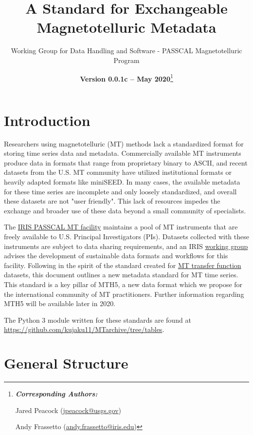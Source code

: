 \documentclass[12pt]{article}
\title{A Standard for Exchangeable Magnetotelluric Metadata}
\date{\textbf{Version 0.0.1c -- May 2020}\footnote{\noindent\textbf{\textit{Corresponding Authors:}}
		
		Jared Peacock (\url{jpeacock@usgs.gov})
		
		Andy Frassetto (\url{andy.frassetto@iris.edu})}}
\author[1]{Working Group for Data Handling and Software - PASSCAL Magnetotelluric Program}
\affil[1]{Portable Array Seismic Studies of the Continental Lithosphere, Incorporated Research Institutions for Seismology}
\begin{document}
	
\maketitle

\tableofcontents
\vspace{1cm}


\newpage

\section{Introduction}

Researchers using magnetotelluric (MT) methods lack a standardized format for storing time series data and metadata. Commercially available MT instruments produce data in formats that range from proprietary binary to ASCII, and recent datasets from the U.S. MT community have utilized institutional formats or heavily adapted formats like miniSEED. In many cases, the available metadata for these time series are incomplete and only loosely standardized, and overall these datasets are not "user friendly". This lack of resources impedes the exchange and broader use of these data beyond a small community of specialists.

The \href{https://www.iris.edu/hq/programs/passcal/magnetotelluricnstrumentation}{IRIS PASSCAL MT facility} maintains a pool of MT instruments that are freely available to U.S. Principal Investigators (PIs). Datasets collected with these instruments are subject to data sharing requirements, and an IRIS \href{https://www.iris.edu/hq/aboutris/governance/mtoft}{working group} advises the development of sustainable data formats and workflows for this facility. Following in the spirit of the standard created for \href{https://library.seg.org/doi/10.1190/geo2018-0679.1}{MT transfer function} datasets, this document outlines a new metadata standard for MT time series. This standard is a key pillar of MTH5, a new data format which we propose for the international community of MT practitioners. Further information regarding MTH5 will be available later in 2020.

The Python 3 module written for these standards are found at \url{https://github.com/kujaku11/MTarchive/tree/tables}.

\section{General Structure}
\end{document}
